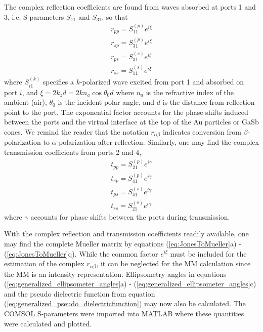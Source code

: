The complex reflection coefficients are found from waves absorbed at ports 1 and 3, i.e. S-parameters $S_{11}$ and $S_{31}$, so that
\begin{subequations} 
\begin{align}
    r_{pp} = S_{11}^{(p)} e^{i\xi}  \\
    r_{sp} = S_{31}^{(p)}e^{i\xi}   \\
    r_{ps} = S_{31}^{(s)}e^{i\xi}   \\
    r_{ss} = S_{11}^{(s)}e^{i\xi}   
\end{align}
\end{subequations}
where $S_{i1}^{(k)}$ specifies a $k$-polarized wave excited from port 1 and absorbed on port $i$, and $\xi=2k_zd=2kn_a\cos\theta_0d$ where $n_a$ is the refractive index of the ambient (air), $\theta_0$ is the incident polar angle, and $d$ is the distance from reflection point to the port. The exponential factor accounts for the phase shifts induced between the ports and the virtual interface at the top of the Au particles or GaSb cones. We remind the reader that the notation $r_{\alpha\beta}$ indicates conversion from $\beta$-polarization to $\alpha$-polarization after reflection. Similarly, one may find the complex transmission coefficients from ports 2 and 4,
\begin{subequations} 
\begin{align}
    t_{pp} = S_{21}^{(p)}e^{i\gamma}  \\
    t_{sp} = S_{41}^{(p)}e^{i\gamma}  \\
    t_{ps} = S_{41}^{(s)}e^{i\gamma}  \\
    t_{ss} = S_{21}^{(s)}e^{i\gamma}
\end{align}
\end{subequations}
where $\gamma$ accounts for phase shifts between the ports during transmission.

With the complex reflection and transmission coefficients readily available, one may find the complete Mueller matrix by equations (\ref{eq:JonesToMueller}a) - (\ref{eq:JonesToMueller}q). While the common factor $e^{i\xi}$ must be included for the estimation of the complex $r_{\alpha\beta}$, it can be neglected for the MM calculation since the MM is an intensity representation. Ellipsometry angles in equations (\ref{eq:generalized_ellipsometer_angles}a) - (\ref{eq:generalized_ellipsometer_angles}c) and the pseudo dielectric function from equation (\ref{eq:generalized_pseudo_dielectricfunction}) may now also be calculated. The COMSOL S-parameters were imported into MATLAB where these quantities were calculated and plotted.

